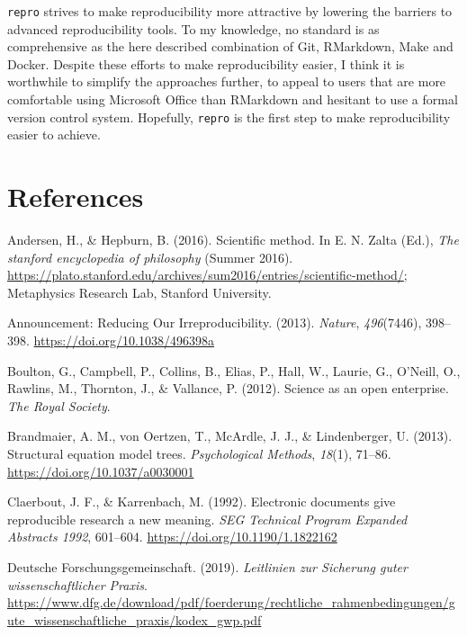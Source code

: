 \documentclass[12pt,a4paper,twoside]{article}
\begin{document}
\texttt{repro} strives to make reproducibility more attractive by lowering the barriers to advanced reproducibility tools.
To my knowledge, no standard is as comprehensive as the here described combination of Git, RMarkdown, Make and Docker.
Despite these efforts to make reproducibility easier, I think it is worthwhile to simplify the approaches further, to appeal to users that are more comfortable using Microsoft Office than RMarkdown and hesitant to use a formal version control system.
Hopefully, \texttt{repro} is the first step to make reproducibility easier to achieve.

\hypertarget{references}{%
\section*{References}\label{references}}

\hypertarget{refs}{}
\leavevmode\hypertarget{ref-andersonScientificMethod2016}{}%
Andersen, H., \& Hepburn, B. (2016). Scientific method. In E. N. Zalta (Ed.), \emph{The stanford encyclopedia of philosophy} (Summer 2016). \url{https://plato.stanford.edu/archives/sum2016/entries/scientific-method/}; Metaphysics Research Lab, Stanford University.

\leavevmode\hypertarget{ref-AnnouncementReducingOur2013}{}%
Announcement: Reducing Our Irreproducibility. (2013). \emph{Nature}, \emph{496}(7446), 398--398. \url{https://doi.org/10.1038/496398a}

\leavevmode\hypertarget{ref-boultonScienceOpenEnterprise2012}{}%
Boulton, G., Campbell, P., Collins, B., Elias, P., Hall, W., Laurie, G., O'Neill, O., Rawlins, M., Thornton, J., \& Vallance, P. (2012). Science as an open enterprise. \emph{The Royal Society}.

\leavevmode\hypertarget{ref-brandmaierStructuralEquationModel2013}{}%
Brandmaier, A. M., von Oertzen, T., McArdle, J. J., \& Lindenberger, U. (2013). Structural equation model trees. \emph{Psychological Methods}, \emph{18}(1), 71--86. \url{https://doi.org/10.1037/a0030001}

\leavevmode\hypertarget{ref-claerboutElectronicDocumentsGive1992}{}%
Claerbout, J. F., \& Karrenbach, M. (1992). Electronic documents give reproducible research a new meaning. \emph{SEG Technical Program Expanded Abstracts 1992}, 601--604. \url{https://doi.org/10.1190/1.1822162}

\leavevmode\hypertarget{ref-dfg2019}{}%
Deutsche Forschungsgemeinschaft. (2019). \emph{Leitlinien zur Sicherung guter wissenschaftlicher Praxis}. \url{https://www.dfg.de/download/pdf/foerderung/rechtliche_rahmenbedingungen/gute_wissenschaftliche_praxis/kodex_gwp.pdf}
\end{document}
